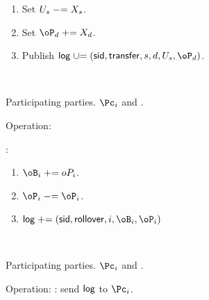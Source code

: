 \begin{protocol}
\begin{enumerate}
\begin{enumerate}
		
		     \item  Set $U_s \mathrel{-}= X_s$. 
              
              \item  Set $\oP_d \pluseq X_d$. 
              
              		     
		     \item Publish  $\historylog \unioneq (\sid,\transfer,s,d,U_s,\oP_d)$.
		     
		\end{enumerate}
		
	\end{enumerate}
	
\end{protocol}




\begin{protocol}~\label{prot:ConfidentialTransactions:Rollover}
	\item[Participating parties.] $\Pc_i$ and \Cc.
	
\item[Operation:] ~
	
	\Cc:
	
	\begin{enumerate}
	
	\item $\oB_i  \pluseq \\oP_i$.
	
	
	\item  $\oP_i \minuseq \oP_i$.
	
	\item  $\historylog \pluseq (\sid,\rollover,i,\oB_i,\oP_i)$
	
	
\end{enumerate}
	
\end{protocol}

\begin{protocol}~\label{prot:ConfidentialTransactions:History}
	\item[Participating parties.] $\Pc_i$ and \Cc.
		
	\item Operation: \Cc: send  $\mathsf{log}$ to $\Pc_i$.
	
\end{protocol}
